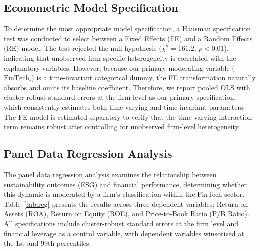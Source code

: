 \documentclass[12pt]{article}
\begin{document}
\subsection{Econometric Model Specification}
To determine the most appropriate model specification, a Hausman specification test was conducted to select between a Fixed Effects (FE) and a Random Effects (RE) model. The test rejected the null hypothesis ($\chi^2 = 161.2,\ p < 0.01$), indicating that unobserved firm-specific heterogeneity is correlated with the explanatory variables. However, because our primary moderating variable ($\text{FinTech}_i$) is a time-invariant categorical dummy, the FE transformation naturally absorbs and omits its baseline coefficient. Therefore, we report pooled OLS with cluster-robust standard errors at the firm level as our primary specification, which consistently estimates both time-varying and time-invariant parameters. The FE model is estimated separately to verify that the time-varying interaction term remains robust after controlling for unobserved firm-level heterogeneity.

\subsection{Panel Data Regression Analysis}
The panel data regression analysis examines the relationship between sustainability outcomes (ESG) and financial performance, determining whether this dynamic is moderated by a firm's classification within the FinTech sector. Table~\ref{tab:reg} presents the results across three dependent variables: Return on Assets (ROA), Return on Equity (ROE), and Price-to-Book Ratio (P/B Ratio). All specifications include cluster-robust standard errors at the firm level and financial leverage as a control variable, with dependent variables winsorized at the 1st and 99th percentiles.
\end{document}
